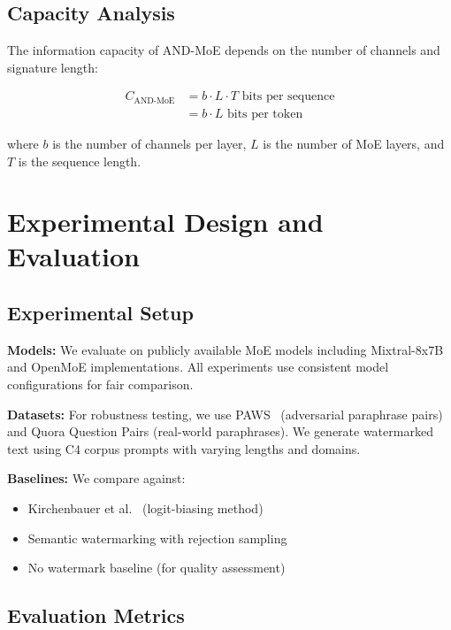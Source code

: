 \documentclass[letterpaper,twocolumn,10pt]{article}
\begin{document}
\subsection{Capacity Analysis}

The information capacity of AND-MoE depends on the number of channels and signature length:

\begin{align}
C_{\text{AND-MoE}} &= b \cdot L \cdot T \text{ bits per sequence} \\
&= b \cdot L \text{ bits per token}
\end{align}

where $b$ is the number of channels per layer, $L$ is the number of MoE layers, and $T$ is the sequence length.

\section{Experimental Design and Evaluation}

\subsection{Experimental Setup}

\textbf{Models:} We evaluate on publicly available MoE models including Mixtral-8x7B and OpenMoE implementations. All experiments use consistent model configurations for fair comparison.

\textbf{Datasets:} For robustness testing, we use PAWS~\cite{zhang2019paws} (adversarial paraphrase pairs) and Quora Question Pairs (real-world paraphrases). We generate watermarked text using C4 corpus prompts with varying lengths and domains.

\textbf{Baselines:} We compare against:
\begin{itemize}
\item Kirchenbauer et al.~\cite{kirchenbauer2023watermark} (logit-biasing method)
\item Semantic watermarking with rejection sampling
\item No watermark baseline (for quality assessment)
\end{itemize}

\subsection{Evaluation Metrics}
\end{document}
